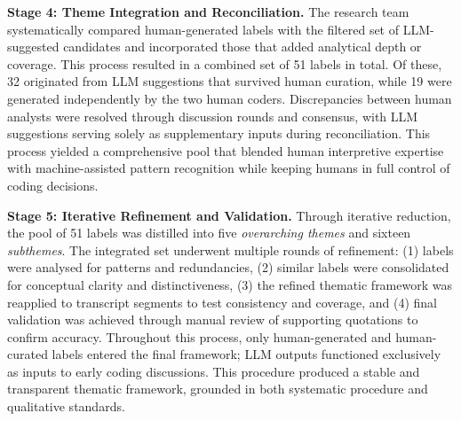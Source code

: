 \textbf{Stage 4: Theme Integration and Reconciliation.}
The research team systematically compared human-generated labels with the filtered set of LLM-suggested candidates and incorporated those that added analytical depth or coverage. This process resulted in a combined set of 51 labels in total. Of these, 32 originated from LLM suggestions that survived human curation, while 19 were generated independently by the two human coders. Discrepancies between human analysts were resolved through discussion rounds and consensus, with LLM suggestions serving solely as supplementary inputs during reconciliation. This process yielded a comprehensive pool that blended human interpretive expertise with machine-assisted pattern recognition while keeping humans in full control of coding decisions.

\textbf{Stage 5: Iterative Refinement and Validation.}
Through iterative reduction, the pool of 51 labels was distilled into five \emph{overarching themes} and sixteen \emph{subthemes}. The integrated set underwent multiple rounds of refinement: (1) labels were analysed for patterns and redundancies, (2) similar labels were consolidated for conceptual clarity and distinctiveness, (3) the refined thematic framework was reapplied to transcript segments to test consistency and coverage, and (4) final validation was achieved through manual review of supporting quotations to confirm accuracy. Throughout this process, only human-generated and human-curated labels entered the final framework; LLM outputs functioned exclusively as inputs to early coding discussions. This procedure produced a stable and transparent thematic framework, grounded in both systematic procedure and qualitative standards.

